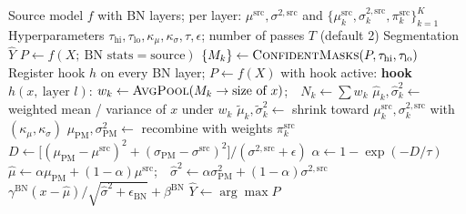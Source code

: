 \documentclass[11pt,a4paper]{article}
\newcommand{\src}{\mathrm{src}}
\newcommand{\PM}{\mathrm{PM}}
\begin{document}
\begin{algorithm}[h]
\caption{PMSA-BN: test-time adaptation for one image (or small batch) $X$}
\label{alg:pmsa}
\begin{algorithmic}[1]
\Require Source model $f$ with BN layers; per layer: $\mu^{\src},\sigma^{2,\src}$ and $\{\mu^{\src}_k,\sigma^{2,\src}_k,\pi^{\src}_k\}_{k=1}^K$
\Require Hyperparameters $\tau_{\mathrm{hi}},\tau_{\mathrm{lo}},\kappa_\mu,\kappa_\sigma,\tau,\epsilon$; number of passes $T$ (default 2)
\Ensure Segmentation $\hat Y$
\State $P \gets f(X;\ \text{BN stats} = \text{source})$ 
  \State $\{M_k\} \gets \textsc{ConfidentMasks}(P,\tau_{\mathrm{hi}},\tau_{\mathrm{lo}})$ 
  \State Register hook $h$ on every BN layer; $P \gets f(X)$ with hook active:
  \Statex \hspace{\algorithmicindent}\textbf{hook} $h(x,\ \text{layer } l)$:
  \State \hspace{\algorithmicindent}$w_k \gets \textsc{AvgPool}(M_k \to \text{size of } x)$;\ \ $N_k \gets \sum w_k$ 
  \State \hspace{\algorithmicindent}$\hat\mu_k,\hat\sigma^2_k \gets$ weighted mean / variance of $x$ under $w_k$
  \State \hspace{\algorithmicindent}$\tilde\mu_k,\tilde\sigma^2_k \gets$ shrink toward $\mu^{\src}_k,\sigma^{2,\src}_k$ with $(\kappa_\mu,\kappa_\sigma)$ 
  \State \hspace{\algorithmicindent}$\mu_{\PM},\sigma^2_{\PM} \gets$ recombine with weights $\pi^{\src}_k$ 
  \State \hspace{\algorithmicindent}$D \gets \bigl[(\mu_{\PM}-\mu^{\src})^2 + (\sigma_{\PM}-\sigma^{\src})^2\bigr] / (\sigma^{2,\src}+\epsilon)$ 
  \State \hspace{\algorithmicindent}$\alpha \gets 1-\exp(-D/\tau)$ 
  \State \hspace{\algorithmicindent}$\hat\mu \gets \alpha\mu_{\PM} + (1-\alpha)\mu^{\src}$;\ \ $\hat\sigma^2 \gets \alpha\sigma^2_{\PM} + (1-\alpha)\sigma^{2,\src}$ 
  \State \hspace{\algorithmicindent}\Return $\gamma^{\mathrm{BN}}(x-\hat\mu)/\sqrt{\hat\sigma^2+\epsilon_{\mathrm{BN}}} + \beta^{\mathrm{BN}}$
\EndFor
\State \Return $\hat Y \gets \arg\max P$ 
\end{algorithmic}
\end{algorithm}

\end{document}
